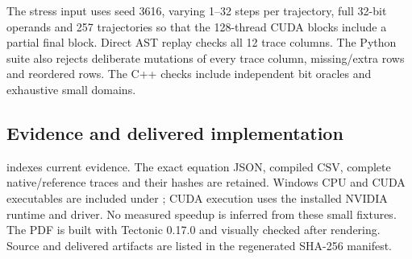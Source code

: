 The stress input uses seed 3616, varying 1--32 steps per trajectory, full 32-bit
operands and 257 trajectories so that the 128-thread CUDA blocks include a partial
final block. Direct AST replay checks all 12 trace columns. The Python suite also
rejects deliberate mutations of every trace column, missing/extra rows and reordered
rows. The C++ checks include independent bit oracles and exhaustive small domains.

\subsection{Evidence and delivered implementation}
 indexes current evidence. The exact equation
JSON, compiled CSV, complete native/reference traces and their hashes are retained.
Windows CPU and CUDA executables are included under ; CUDA
execution uses the installed NVIDIA runtime and driver. No measured speedup is
inferred from these small fixtures. The PDF is built with Tectonic 0.17.0 and
visually checked after rendering. Source and delivered artifacts are listed in
the regenerated SHA-256 manifest.
\clearpage
